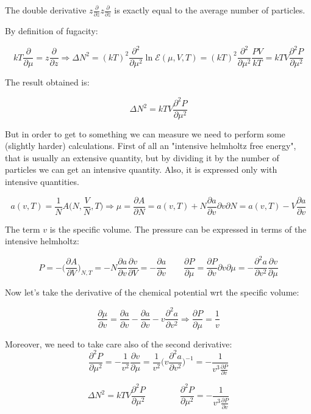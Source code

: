 The double derivative $z\frac{\partial}{\partial z}z\frac{\partial}{\partial z}$ is exactly equal to the average number of particles. 

By definition of fugacity:

	$$kT\frac{\partial}{\partial\mu} = z\frac{\partial}{\partial z}\Rightarrow\Delta N^2 = (kT)^2\frac{\partial^2}{\partial\mu^2}\ln\mathcal{E}(\mu, V, T) = (kT)^2\frac{\partial^2}{\partial\mu^2}\frac{PV}{kT} = kTV\frac{\partial^2 P}{\partial\mu^2}$$

The result obtained is:

	$$\Delta N^2 = kTV\frac{\partial^2 P}{\partial \mu^2}$$

But in order to get to something we can measure we need to perform some (slightly harder) calculations.
First of all an "intensive helmholtz free energy", that is usually an extensive quantity, but by dividing it by the number of particles we can get an intensive quantity.
Also, it is expressed only with intensive quantities. 

	$$a(v, T) = \frac{1}{N}A\biggl(N, \frac{V}{N}, T\biggr) \Rightarrow \mu = \frac{\partial A}{\partial N} = a(v, T) + N\frac{\partial a}{\partial v}{\partial v}{\partial N} = a(v, T) - V\frac{\partial a}{\partial v}$$
	
	The term $v$ is the specific volume. 
	The pressure can be expressed in terms of the intensive helmholtz: 

	$$P = -\biggl(\frac{\partial A}{\partial V}\biggr)_{N, T} = -N\frac{\partial a}{\partial v}\frac{\partial v}{\partial V} = -\frac{\partial a}{\partial v}\qquad\frac{\partial P}{\partial\mu} = \frac{\partial P}{\partial  v}{\partial v}{\partial\mu} = -\frac{\partial^2 a}{\partial v^2}\frac{\partial v}{\partial \mu}$$
	
	Now let's take the derivative of the chemical potential wrt the specific volume:

	$$\frac{\partial\mu}{\partial v} = \frac{\partial a}{\partial v}-\frac{\partial a}{\partial v} - v \frac{\partial^2a}{\partial v^2}\Rightarrow \frac{\partial P}{\partial\mu} = \frac{1}{v}$$

Moreover, we need to take care also of the second derivative:
	$$\frac{\partial^2P}{\partial\mu^2} = -\frac{1}{v^2}\frac{\partial v}{\partial\mu} = \frac{1}{v^2}\biggl(v\frac{\partial^2 a}{\partial v^2}\biggr)^{-1} = -\frac{1}{v^3\frac{\partial P}{\partial v}}$$

	$$\Delta N^2 = kTV\frac{\partial^2 P}{\partial\mu^2}\qquad\qquad\frac{\partial^2 P}{\partial\mu^2} = -\frac{1}{v^3\frac{\partial P}{\partial v}}$$
	
